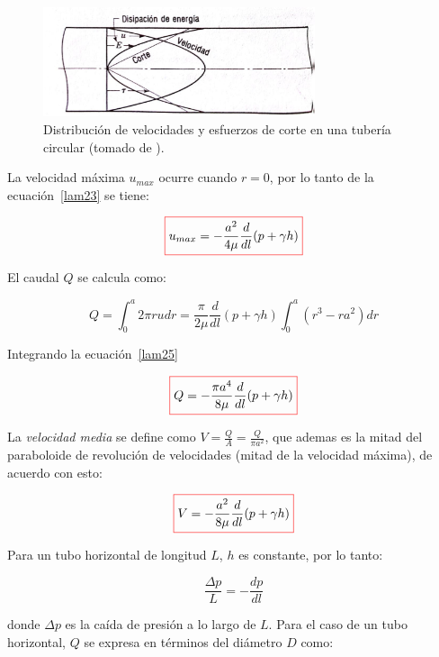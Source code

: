 \documentclass[11pt, oneside]{article}
\begin{document}
\begin{figure}[h]
\centering
\includegraphics[width=8cm]{lamc1.jpeg}
\caption{Distribuci\'on de velocidades y esfuerzos de corte en una tuber\'ia circular (tomado de \cite{streeter}).}
\label{lamc1}
\end{figure}

La velocidad m\'axima $u_{max}$ ocurre cuando $r=0$, por lo tanto de la ecuaci\'on~\ref{lam23} se tiene:

\begin{equation}
\color{red}\boxed{\color{black} u_{max} = -\frac{a^2}{4\mu}\frac{d}{dl}(p + \gamma h) }
\label{lam24}
\end{equation}

El caudal $Q$ se calcula como:

\begin{equation}
 Q = \int_0^a 2\pi r u dr = \frac{\pi}{2\mu}\frac{d}{dl}(p + \gamma h) \int_0^a (r^3 -r a^2) dr 
\label{lam25}
\end{equation}

Integrando la ecuaci\'on~\ref{lam25}

\begin{equation}
\color{red}\boxed{\color{black} Q =  -\frac{\pi a^4}{8\mu}\frac{d}{dl}(p + \gamma h) }
\label{lam26}
\end{equation}

La \emph{velocidad media} se define como $V = \frac{Q}{A} = \frac{Q}{\pi a^2}$, que ademas es la mitad del paraboloide de revoluci\'on de velocidades (mitad de la velocidad m\'axima), de acuerdo con esto:
 
\begin{equation}
\color{red}\boxed{\color{black} V = -\frac{a^2}{8\mu}\frac{d}{dl}(p + \gamma h) }
\label{lam27}
\end{equation}

Para un tubo horizontal de longitud $L$, $h$ es constante, por lo tanto:

\begin{equation}
\frac{\Delta p}{L} = -\frac{dp}{dl}
\label{lam28}
\end{equation}

donde $\Delta p$ es la ca\'ida de presi\'on a lo largo de $L$. Para el caso de un tubo horizontal, $Q$ se expresa en t\'erminos del di\'ametro $D$ como:
\end{document}
